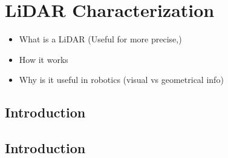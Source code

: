 \chapter{LiDAR Characterization}

\begin{itemize}
    \item What is a LiDAR (Useful for more precise,)
    \item How it works
    \item Why is it useful in robotics (visual vs geometrical info)
\end{itemize}

\section{Introduction}
\label{sec:chap_lidar_intro}



\section{Introduction}
\label{sec:chap_lidar_data_acquisition}



